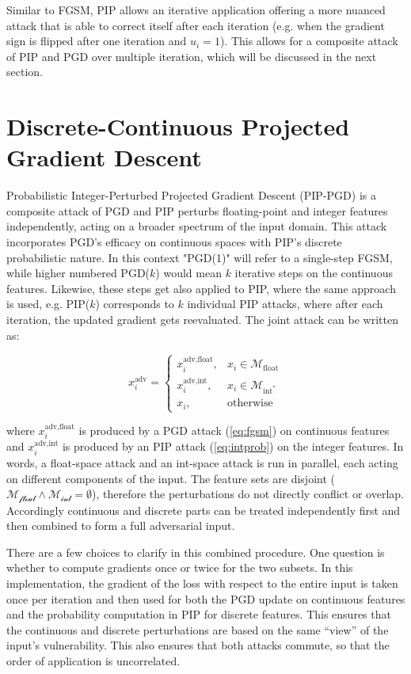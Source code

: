 Similar to FGSM, PIP allows an iterative application offering a more nuanced attack that is able to correct itself after each iteration (e.g. when the gradient sign is flipped after one iteration and $u_i=1$). This allows for a composite attack of PIP and PGD over multiple iteration, which will be discussed in the next section. 

\section{Discrete-Continuous Projected Gradient Descent}
\label{sec:method_combined}

Probabilistic Integer-Perturbed Projected Gradient Descent (PIP-PGD) is a composite attack of PGD and PIP perturbs floating-point and integer features independently, acting on a broader spectrum of the input domain. This attack incorporates PGD's efficacy on continuous spaces with PIP's discrete probabilistic nature. In this context "PGD(1)" will refer to a single-step FGSM, while higher numbered PGD($k$) would mean $k$ iterative steps on the continuous features. Likewise, these steps get also applied to PIP, where the same approach is used, e.g. PIP($k$) corresponds to $k$ individual PIP attacks, where after each iteration, the updated gradient gets reevaluated. The joint attack can be written as:

\begin{equation}
x_i^{\text{adv}} = 
    \begin{cases} 
    x^{\text{adv,float}}_i, & x_i\in\mathcal{M}_{\text{float}} \\[4pt]
    x^{\text{adv,int}}_i,   & x_i\in\mathcal{M}_{\text{int}^*}   \\[4pt]
    x_i, & \text{otherwise}
    \end{cases}
\label{eq:joint_attack}
\end{equation}

where $x^{\text{adv,float}}_i$ is produced by a PGD attack (\ref{eq:fgsm}) on continuous features and $x^{\text{adv,int}}_i$ is produced by an PIP attack (\ref{eq:intprob}) on the integer features. In words, a float-space attack and an int-space attack is run in parallel, each acting on different components of the input. The feature sets are disjoint ($\mathcal{M_{\text{float}}} \wedge \mathcal{M_{\text{int}}}=\emptyset$), therefore the perturbations do not directly conflict or overlap. Accordingly continuous and discrete parts can be treated independently first and then combined to form a full adversarial input.

There are a few choices to clarify in this combined procedure. One question is whether to compute gradients once or twice for the two subsets. In this implementation, the gradient of the loss with respect to the entire input is taken once per iteration and then used for both the PGD update on continuous features and the probability computation in PIP for discrete features. This ensures that the continuous and discrete perturbations are based on the same “view” of the input’s vulnerability. This also ensures that both attacks commute, so that the order of application is uncorrelated.